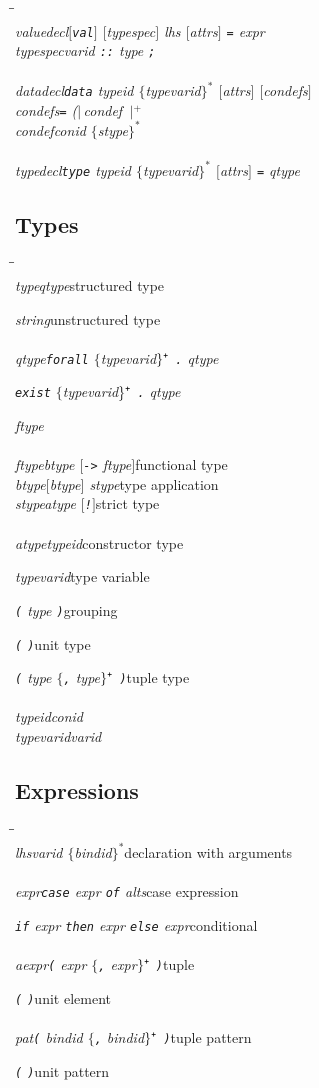 \documentclass[a4paper,dvips]{article}
\newcommand{\ttbar}{\char124}
\newenvironment{productions}%
  {\begin{tabbing}\hspace{2cm}\=\hspace{6cm}\=\kill{}\\}%
  {\end{tabbing}}
\newcommand{\fixed}[1]{\makebox[3.5em]{#1}}
\newcommand{\production}[3]{\nont{#1}\>\fixed{$\rightarrow$}\nont{#2}\>#3\\}
\newcommand{\next}[2]{\strut{}\>\fixed{$|$}\nont{#1}\>#2\\}
\newcommand{\nont}[1]{\textit{#1}}
\newcommand{\pspace}{\hspace{0.25ex}}
\newcommand{\opt}[1]{$[$#1$]$}
\newcommand{\many}[1]{$\{$#1\pspace$\}^*$}
\newcommand{\manyone}[1]{$\{$#1\pspace$\}^\textrm{\tt+}$}
\newcommand{\bananas}[2]{{\rm (}\hspace{-0.5ex}$|\,$#1\pspace$\,|$\hspace{-0.5ex}{\rm )}$^{#2}$}
\newcommand{\sepbyone}[2]{\bananas{#1 #2}{+}}
\newcommand{\sepbytwo}[2]{#1 \manyone{#2 #1}}
\newcommand{\term}[1]{{\tt #1}}
\newcommand{\por}{$|$}
\begin{document}
\begin{productions}
\production{valuedecl}{\opt{\term{val}} \opt{typespec} lhs \opt{attrs} \term{=} expr}{}
\production{typespec}{varid \term{::} type \term{;}}{}
\\
\production{datadecl}{\term{data} typeid \many{typevarid} \opt{attrs} \opt{condefs}}{}
\production{condefs}{\term{=} \sepbyone{condef}{\term{\ttbar}} }{}
\production{condef}{conid \many{stype}}{}
\\
\production{typedecl}{\term{type} typeid \many{typevarid} \opt{attrs} \term{=} qtype}{}
\end{productions}

\subsection{Types}

\begin{productions}
\production{type}{qtype}{structured type}
\next{string}{unstructured type}
\\
\production{qtype}{\term{forall} \manyone{typevarid} \term{.} qtype}{}
\next{\term{exist} \manyone{typevarid} \term{.} qtype}{}
\next{ftype}{}
\\
\production{ftype}{btype \opt{\term{->} ftype}}{functional type}
\production{btype}{\opt{btype} stype}{type application}
\production{stype}{atype \opt{\term{!}}}{strict type}
\\
\production{atype}{typeid}{constructor type}
\next{typevarid}{type variable}
\next{\term{(} type \term{)}}{grouping}
\next{\term{(} \term{)}}{unit type}
\next{\term{(} \sepbytwo{type}{\term{,}} \term{)}}{tuple type}
\\
\production{typeid}{conid}{}
\production{typevarid}{varid}{}
\end{productions}


\subsection{Expressions}

\begin{productions}
\production{lhs}{varid \many{bindid}}{declaration with arguments}
\\
\production{expr}{\term{case} expr \term{of} alts}{case expression}
\next{\term{if} expr \term{then} expr \term{else} expr}{conditional}
\\
\production{aexpr}{\term{(} expr \manyone{\term{,} expr} \term{)}}{tuple}
\next{\term{(} \term{)}}{unit element}
\\
\production{pat}{\term{(} \sepbytwo{bindid}{\term{,}} \term{)}}{tuple pattern}
\next{\term{(} \term{)}}{unit pattern}
\end{productions}
\end{document}
